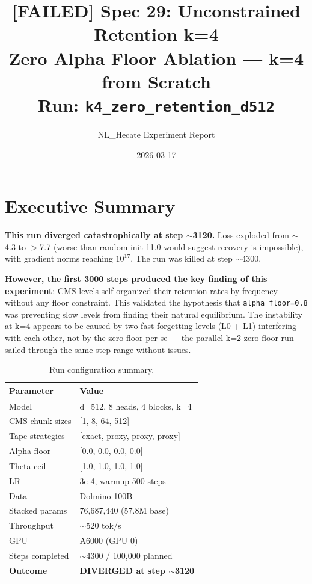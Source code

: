 \documentclass[11pt,a4paper]{article}
\title{%
  \textcolor{failred}{\textbf{[FAILED]}} Spec 29: Unconstrained Retention k=4\\[0.5em]
  \large Zero Alpha Floor Ablation --- k=4 from Scratch\\
  \large Run: \texttt{k4\_zero\_retention\_d512}
}
\author{NL\_Hecate Experiment Report}
\date{2026-03-17}
\begin{document}
\maketitle
\tableofcontents
\newpage

\section{Executive Summary}

\textbf{This run diverged catastrophically at step $\sim$3120.} Loss exploded from $\sim$4.3 to $>$7.7 (worse than random init 11.0 would suggest recovery is impossible), with gradient norms reaching $10^{17}$. The run was killed at step $\sim$4300.

\textbf{However, the first 3000 steps produced the key finding of this experiment}: CMS levels self-organized their retention rates by frequency without any floor constraint. This validated the hypothesis that \texttt{alpha\_floor=0.8} was preventing slow levels from finding their natural equilibrium. The instability at k=4 appears to be caused by two fast-forgetting levels (L0 + L1) interfering with each other, not by the zero floor per se --- the parallel k=2 zero-floor run sailed through the same step range without issues.

\begin{table}[h]
\centering
\begin{tabular}{ll}
\toprule
\textbf{Parameter} & \textbf{Value} \\
\midrule
Model & d=512, 8 heads, 4 blocks, k=4 \\
CMS chunk sizes & [1, 8, 64, 512] \\
Tape strategies & [exact, proxy, proxy, proxy] \\
Alpha floor & [0.0, 0.0, 0.0, 0.0] \\
Theta ceil & [1.0, 1.0, 1.0, 1.0] \\
LR & 3e-4, warmup 500 steps \\
Data & Dolmino-100B \\
Stacked params & 76,687,440 (57.8M base) \\
Throughput & $\sim$520 tok/s \\
GPU & A6000 (GPU 0) \\
Steps completed & $\sim$4300 / 100,000 planned \\
\textbf{Outcome} & \textcolor{failred}{\textbf{DIVERGED at step $\sim$3120}} \\
\bottomrule
\end{tabular}
\caption{Run configuration summary.}
\end{table}
\end{document}
